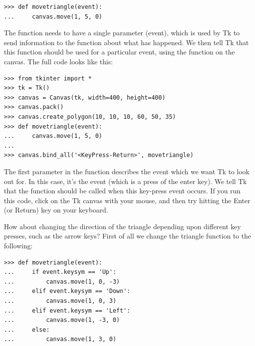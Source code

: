 \begin{listing}
\begin{verbatim}
>>> def movetriangle(event):
...     canvas.move(1, 5, 0)
\end{verbatim}
\end{listing}

The function needs to have a single parameter (event), which is used by Tk to send information to the function about what has happened.  We then tell Tk that this function should be used for a particular event, using the  function on the canvas. The full code looks like this:

\begin{listing}
\begin{verbatim}
>>> from tkinter import *
>>> tk = Tk()
>>> canvas = Canvas(tk, width=400, height=400)
>>> canvas.pack()
>>> canvas.create_polygon(10, 10, 10, 60, 50, 35)
>>> def movetriangle(event):
...     canvas.move(1, 5, 0)
...
>>> canvas.bind_all('<KeyPress-Return>', movetriangle)
\end{verbatim}
\end{listing}

The first parameter in the  function describes the event which we want Tk to look out for. In this case, it's the event  (which is a press of the enter key).  We tell Tk that the  function should be called when this key-press event occurs.  If you run this code, click on the Tk canvas with your mouse, and then try hitting the Enter (or Return) key on your keyboard.

How about changing the direction of the triangle depending upon different key presses, such as the arrow keys? First of all we change the  triangle function to the following:

\begin{listing}
\begin{verbatim}
>>> def movetriangle(event):
...     if event.keysym == 'Up':
...         canvas.move(1, 0, -3)
...     elif event.keysym == 'Down':
...         canvas.move(1, 0, 3)
...     elif event.keysym == 'Left':
...         canvas.move(1, -3, 0)
...     else:
...         canvas.move(1, 3, 0)
\end{verbatim}
\end{listing}

